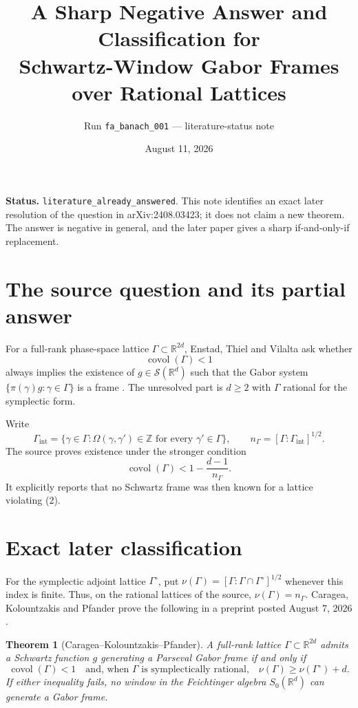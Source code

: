 \documentclass[11pt]{article}
\title{A Sharp Negative Answer and Classification for\\
Schwartz-Window Gabor Frames over Rational Lattices}
\author{Run \texttt{fa\_banach\_001} --- literature-status note}
\date{August 11, 2026}
\newtheorem*{theorem}{Theorem}
\newcommand{\Szero}{S_0}
\newcommand{\covol}{\operatorname{covol}}
\begin{document}
\maketitle

\noindent\textbf{Status.} \texttt{literature\_already\_answered}.  This note
identifies an exact later resolution of the question in arXiv:2408.03423; it
does not claim a new theorem.  The answer is negative in general, and the
later paper gives a sharp if-and-only-if replacement.

\section*{The source question and its partial answer}
For a full-rank phase-space lattice $\Gamma\subset\mathbb R^{2d}$, Enstad,
Thiel and Vilalta ask whether
\begin{equation*}
 \covol(\Gamma)<1                                      \tag{1}
\end{equation*}
always implies the existence of $g\in\mathcal S(\mathbb R^d)$ such that the
Gabor system $\{\pi(\gamma)g:\gamma\in\Gamma\}$ is a frame
\cite[Problem A]{ETV}.  The unresolved part is $d\ge2$ with $\Gamma$
rational for the symplectic form.

Write
\[
 \Gamma_{\mathrm{int}}
 =\{\gamma\in\Gamma:\Omega(\gamma,\gamma')\in\mathbb Z
       \text{ for every }\gamma'\in\Gamma\},
 \qquad
 n_\Gamma=[\Gamma:\Gamma_{\mathrm{int}}]^{1/2}.
\]
The source proves existence under the stronger condition
\begin{equation*}
 \covol(\Gamma)<1-\frac{d-1}{n_\Gamma}.                \tag{2}
\end{equation*}
It explicitly reports that no Schwartz frame was then known for a lattice
violating (2).

\section*{Exact later classification}
For the symplectic adjoint lattice $\Gamma^\circ$, put
$\nu(\Gamma)=[\Gamma:\Gamma\cap\Gamma^\circ]^{1/2}$ whenever this index is
finite.  Thus, on the rational lattices of the source,
$\nu(\Gamma)=n_\Gamma$.  Caragea, Kolountzakis and Pfander prove the
following in a preprint posted August 7, 2026 \cite[Theorems 1.2 and
1.3]{CKP}.

\begin{theorem}[Caragea--Kolountzakis--Pfander]
A full-rank lattice $\Gamma\subset\mathbb R^{2d}$ admits a Schwartz function
$g$ generating a Parseval Gabor frame if and only if
\[
 \covol(\Gamma)<1
 \quad\text{and, when $\Gamma$ is symplectically rational,}\quad
 \nu(\Gamma)\ge \nu(\Gamma^\circ)+d.                 \tag{3}
\]
If either inequality fails, no window in the Feichtinger algebra
$\Szero(\mathbb R^d)$ can generate a Gabor frame.
\end{theorem}
\end{document}
